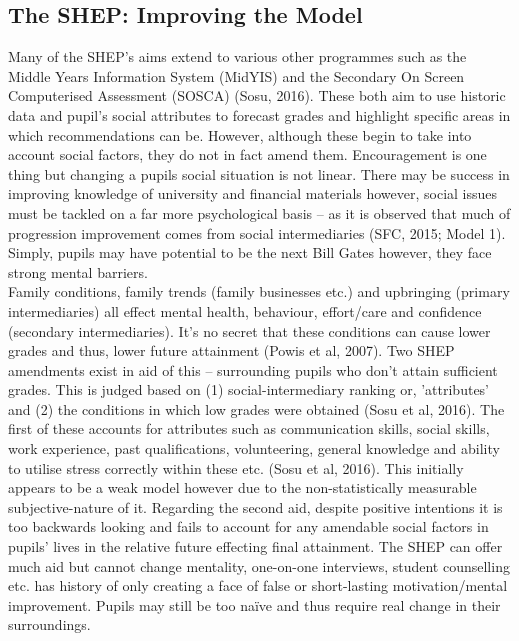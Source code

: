 \documentclass[11pt, english]{article}
\begin{document}
	\subsection{The SHEP: Improving the Model}

	Many of the SHEP's aims extend to various other programmes such as the Middle Years Information System (MidYIS) and the Secondary On Screen Computerised Assessment (SOSCA) (Sosu, 2016). These both aim to use historic data and pupil's social attributes to forecast grades and highlight specific areas in which recommendations can be. However, although these begin to take into account social factors, they do not in fact amend them. Encouragement is one thing but changing a pupils social situation is not linear. There may be success in improving knowledge of university and financial materials however, social issues must be tackled on a far more psychological basis – as it is observed that much of progression improvement comes from social intermediaries (SFC, 2015; Model 1). Simply, pupils may have potential to be the next Bill Gates however, they face strong mental barriers.\\

	Family conditions, family trends (family businesses etc.) and upbringing (primary intermediaries) all effect mental health, behaviour, effort/care and confidence (secondary intermediaries). It's no secret that these conditions can cause lower grades and thus, lower future attainment (Powis et al, 2007). Two SHEP amendments exist in aid of this – surrounding pupils who don't attain sufficient grades. This is judged based on (1) social-intermediary ranking or, 'attributes' and (2) the conditions in which low grades were obtained (Sosu et al, 2016). The first of these accounts for attributes such as communication skills, social skills, work experience, past qualifications, volunteering, general knowledge and ability to utilise stress correctly within these etc. (Sosu et al, 2016). This initially appears to be a weak model however due to the non-statistically measurable subjective-nature of it. Regarding the second aid, despite positive intentions it is too backwards looking and fails to account for any amendable social factors in pupils' lives in the relative future effecting final attainment. The SHEP can offer much aid but cannot change mentality, one-on-one interviews, student counselling etc. has history of only creating a face of false or short-lasting motivation/mental improvement. Pupils may still be too naïve and thus require real change in their surroundings.
\end{document}
